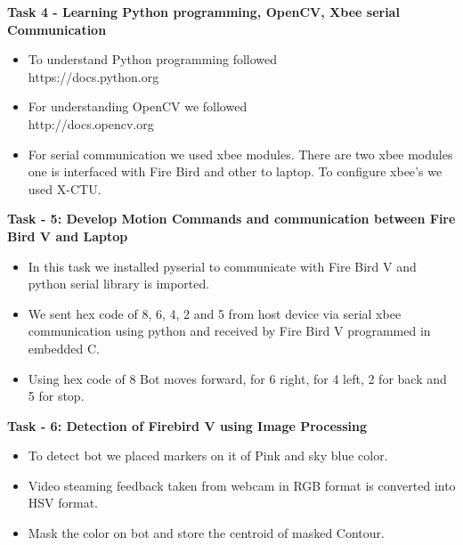 \documentclass[report]{res}
\begin{document}
	\pagebreak
	
	
	{\Large \textbf{Task 4 - Learning Python programming, OpenCV, Xbee serial Communication}}\\
	
	\begin{itemize}
		
		\item To understand Python programming followed \\
		https://docs.python.org \\
		\item For understanding OpenCV we followed\\
		http://docs.opencv.org \\
		\item For serial communication we used xbee modules. There are two xbee modules one is interfaced with Fire Bird and other to laptop. To configure xbee's we used X-CTU.\\
		
	\end{itemize}	
	
	{\Large \textbf{Task - 5: Develop Motion Commands and communication between Fire Bird V and Laptop}} \\
	
	\begin{itemize}
		
		\item In this task we installed pyserial to communicate with Fire Bird V and python serial library is imported. 
		\item We sent hex code of 8, 6, 4, 2 and 5 from host device via serial xbee communication using python and received by Fire Bird V programmed in embedded C. 
		\item Using hex code of 8 Bot moves forward, for 6 right, for 4 left, 2 for back and 5 for stop.\\
		
	\end{itemize} 
	
	{\Large \textbf{Task - 6: Detection of Firebird V using Image Processing}} \\
	\begin{itemize}
		
		\item To detect bot we placed markers on it of Pink and sky blue color. 
		\item Video steaming feedback taken from webcam in RGB format is converted into HSV format.
		\item Mask the color on bot and store the centroid of masked Contour. \\
		
	\end{itemize}
	
\end{document}
